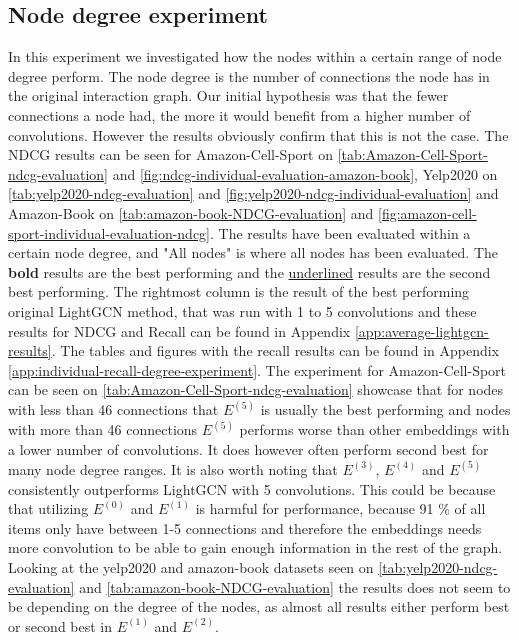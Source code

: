 \subsection{Node degree experiment}\label{subsec:degree-experiment}
In this experiment we investigated how the nodes within a certain range of node degree perform. 
The node degree is the number of connections the node has in the original interaction graph.
Our initial hypothesis was that the fewer connections a node had, the more it would benefit from a higher number of convolutions.
However the results obviously confirm that this is not the case.
The NDCG results can be seen for Amazon-Cell-Sport on \autoref{tab:Amazon-Cell-Sport-ndcg-evaluation} and \autoref{fig:ndcg-individual-evaluation-amazon-book}, Yelp2020 on \autoref{tab:yelp2020-ndcg-evaluation} and \autoref{fig:yelp2020-ndcg-individual-evaluation} and Amazon-Book on \autoref{tab:amazon-book-NDCG-evaluation} and \autoref{fig:amazon-cell-sport-individual-evaluation-ndcg}.
The results have been evaluated within a certain node degree, and "All nodes" is where all nodes has been evaluated.
The \textbf{bold} results are the best performing and the \underline{underlined} results are the second best performing.
The rightmost column is the result of the best performing original LightGCN method, that was run with 1 to 5 convolutions and these results for NDCG and Recall can be found in Appendix \ref{app:average-lightgcn-results}.
The tables and figures with the recall results can be found in Appendix \ref{app:individual-recall-degree-experiment}.
The experiment for Amazon-Cell-Sport can be seen on \autoref{tab:Amazon-Cell-Sport-ndcg-evaluation} showcase that for nodes with less than 46 connections that $E^{(5)}$ is usually the best performing and nodes with more than 46 connections $E^{(5)}$ performs worse than other embeddings with a lower number of convolutions.
It does however often perform second best for many node degree ranges.
It is also worth noting that $E^{(3)}$, $E^{(4)}$ and $E^{(5)}$ consistently outperforms LightGCN with 5 convolutions.
This could be because that utilizing $E^{(0)}$ and $E^{(1)}$ is harmful for performance, because 91 \% of all items only have between 1-5 connections and therefore the embeddings needs more convolution to be able to gain enough information in the rest of the graph.
Looking at the yelp2020 and amazon-book datasets seen on \autoref{tab:yelp2020-ndcg-evaluation} and \autoref{tab:amazon-book-NDCG-evaluation} the results does not seem to be depending on the degree of the nodes, as almost all results either perform best or second best in $E^{(1)}$ and $E^{(2)}$.
